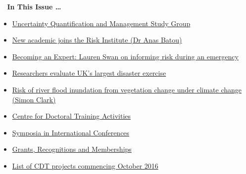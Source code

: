 \documentclass[11pt]{article}%
\begin{document}
\begin{minipage}[t]{.30\linewidth} %
\begin{mdframed}[style=contents,frametitle={}] %
\hypertarget{contents}{\textbf{{\Large ~ In This Issue \ldots}}} %
\begin{footnotesize}
\begin{itemize}
\item \hyperlink{studyGroup}{Uncertainty Quantification and Management Study Group} %
\vspace{7pt}
\item \hyperlink{Anas}{New academic joins the Risk Institute (Dr Anas Batou)}
\vspace{7pt}
\item \hyperlink{Lauren}{Becoming an Expert: Lauren Swan on informing risk during an emergency}
\vspace{7pt}
\item \hyperlink{Lauren2}{Researchers evaluate UK’s largest disaster exercise}
\vspace{7pt}
\item \hyperlink{Simon}{Risk of river flood inundation from vegetation change under climate change (Simon Clark)}
\vspace{7pt}
\item \hyperlink{Training}{Centre for Doctoral Training Activities}
\vspace{7pt}
\item \hyperlink{Symposia}{Symposia in International Conferences}
\vspace{7pt}
\item \hyperlink{Grants}{Grants, Recognitions and Memberships}
\vspace{7pt}
\item \hyperlink{Projects}{List of CDT projects commencing October 2016}
\end{itemize}
\end{footnotesize}
\end{mdframed}
\end{minipage}\hfill %
\end{document}
